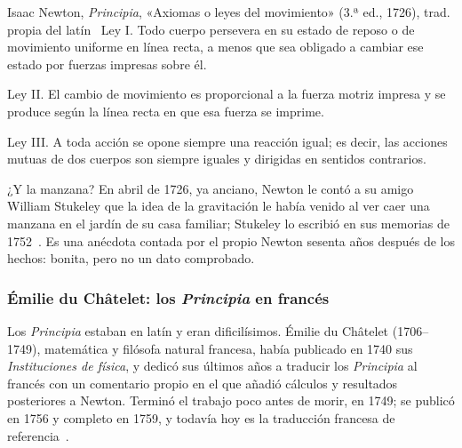 \documentclass[11pt]{article}
\begin{document}
\begin{cita}{Isaac Newton, \emph{Principia}, «Axiomas o leyes del movimiento» (3.ª ed., 1726), trad. propia del latín~\cite{newton1726}}
Ley I. Todo cuerpo persevera en su estado de reposo o de movimiento uniforme en línea recta, a
menos que sea obligado a cambiar ese estado por fuerzas impresas sobre él.

Ley II. El cambio de movimiento es proporcional a la fuerza motriz impresa y se produce según
la línea recta en que esa fuerza se imprime.

Ley III. A toda acción se opone siempre una reacción igual; es decir, las acciones mutuas de
dos cuerpos son siempre iguales y dirigidas en sentidos contrarios.
\end{cita}

¿Y la manzana? En abril de 1726, ya anciano, Newton le contó a su amigo William Stukeley que
la idea de la gravitación le había venido al ver caer una manzana en el jardín de su casa
familiar; Stukeley lo escribió en sus memorias de 1752~\cite{stukeley}. Es una anécdota
contada por el propio Newton sesenta años después de los hechos: bonita, pero no un dato
comprobado.

\subsubsection*{Émilie du Châtelet: los \emph{Principia} en francés}

Los \emph{Principia} estaban en latín y eran dificilísimos. Émilie du Châtelet (1706--1749),
matemática y filósofa natural francesa, había publicado en 1740 sus \emph{Instituciones de
física}, y dedicó sus últimos años a traducir los \emph{Principia} al francés con un
comentario propio en el que añadió cálculos y resultados posteriores a Newton. Terminó el
trabajo poco antes de morir, en 1749; se publicó en 1756 y completo en 1759, y todavía hoy es
la traducción francesa de referencia~\cite{sepChatelet,chatelet1759}.
\end{document}
